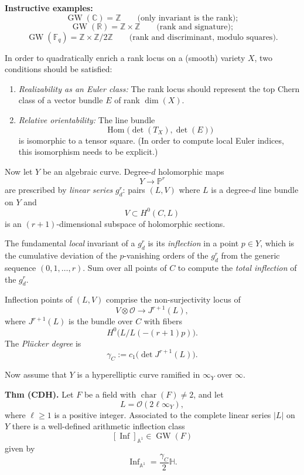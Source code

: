 \medskip\noindent
{\bf Instructive examples:}
$$
\operatorname{GW}(\mathbb{C})
=
\mathbb{Z}
\qquad
\text{(only invariant is the rank)};
$$
$$
\operatorname{GW}(\mathbb{R})
=
\mathbb{Z}\times\mathbb{Z}
\qquad
\text{(rank and signature)};
$$
$$
\operatorname{GW}(\mathbb{F}_q)
=
\mathbb{Z}\times\mathbb{Z}/2\mathbb{Z}
\qquad
\text{(rank and discriminant, modulo
squares)}.
$$

In order to quadratically enrich a rank
locus on a (smooth) variety $X$, two
conditions should be satisfied:
\begin{enumerate}
\item
{\it Realizability as an Euler class:}
The rank locus should represent the top
Chern class of a vector bundle $E$ of
rank $\dim(X)$.

\item
{\it Relative orientability:}
The line bundle
$$
\operatorname{Hom}
\bigl(\det(T_X),\det(E)\bigr)
$$
is isomorphic to a tensor square.
(In order to compute local Euler indices,
this isomorphism needs to be explicit.)
\end{enumerate}

Now let $Y$ be an algebraic curve.
Degree-$d$ holomorphic maps
$$
Y\longrightarrow\mathbb{P}^r
$$
are prescribed by {\it linear series}
$g_d^r$: pairs $(L,V)$ where $L$ is a
degree-$d$ line bundle on $Y$ and
$$
V\subset H^0(C,L)
$$
is an $(r+1)$-dimensional subspace of
holomorphic sections.

The fundamental {\it local} invariant of
a $g_d^r$ is its {\it inflection} in a
point $p\in Y$, which is the cumulative
deviation of the $p$-vanishing orders of
the $g_d^r$ from the generic sequence
$(0,1,\ldots,r)$.
Sum over all points of $C$ to compute the
{\it total inflection} of the $g_d^r$.

Inflection points of $(L,V)$ comprise the
non-surjectivity locus of
$$
V\otimes\mathcal{O}
\longrightarrow
J^{r+1}(L),
$$
where $J^{r+1}(L)$ is the bundle over $C$
with fibers
$$
H^0\bigl(L/L(-(r+1)p)\bigr).
$$
The {\it Pl\"ucker degree} is
$$
\gamma_C
:=
c_1\bigl(\det J^{r+1}(L)\bigr).
$$

Now assume that $Y$ is a hyperelliptic
curve ramified in $\infty_Y$ over
$\infty$.

\medskip\noindent
{\bf Thm (CDH).}
Let $F$ be a field with
$\operatorname{char}(F)\neq 2$, and let
$$
L=\mathcal{O}(2\ell\infty_Y),
$$
where $\ell\geq 1$ is a positive integer.
Associated to the complete linear series
$|L|$ on $Y$ there is a well-defined
arithmetic inflection class
$$
[\operatorname{Inf}]_{\mathbb{A}^1}
\in
\operatorname{GW}(F)
$$
given by
$$
\operatorname{Inf}_{\mathbb{A}^1}
=
\frac{\gamma_C}{2}\mathbb{H}.
$$

